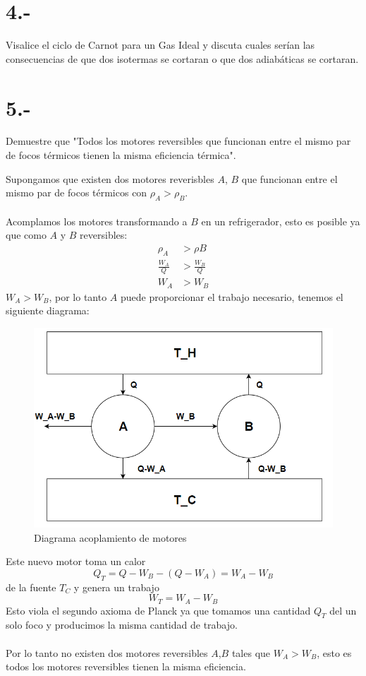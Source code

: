 \documentclass{article}
\begin{document}
\section*{4.-}
Visalice el ciclo de Carnot para un Gas Ideal y discuta cuales serían las consecuencias de que dos isotermas 
se cortaran o que dos adiabáticas se cortaran.
\begin{tcolorbox}[breakable]

\end{tcolorbox}

\section*{5.-}
Demuestre que "Todos los motores reversibles que funcionan entre el mismo 
par de focos térmicos tienen la misma eficiencia térmica".
\begin{tcolorbox}[breakable]
    Supongamos que existen dos motores reverisbles $A$, $B$ que funcionan entre el mismo 
    par de focos térmicos con $\rho_A > \rho_B$. \\ \\
    Acomplamos los motores transformando a $B$ en un refrigerador, esto es posible 
    ya que como $A$ y $B$ reversibles:
    \begin{align*}
        \rho_A &> \rho B \\
        \frac{W_A}{Q} &> \frac{W_B}{Q} \\
        W_A &> W_B
    \end{align*}
    $W_A > W_B$, por lo tanto $A$ puede proporcionar el trabajo necesario,
    tenemos el siguiente diagrama:  
    \begin{figure}[H]
        \centering
        \includegraphics[scale=0.5]{images/p5_diagram.png}
        \caption{Diagrama acoplamiento de motores}
        \label{}
    \end{figure}
    Este nuevo motor toma un calor 
    \[ Q_T = Q-W_B-(Q-W_A) = W_A - W_B \]
    de la fuente $T_C$ y genera un trabajo 
    \[ W_T = W_A-W_B \]
    Esto viola el segundo axioma de Planck ya que tomamos una cantidad $Q_T$ del un solo foco
    y producimos la misma cantidad de trabajo. \\ \\
    Por lo tanto no existen dos motores reversibles $A$,$B$ tales que $W_A > W_B$, esto es 
    todos los motores reversibles tienen la misma eficiencia.
\end{tcolorbox}
\end{document}
